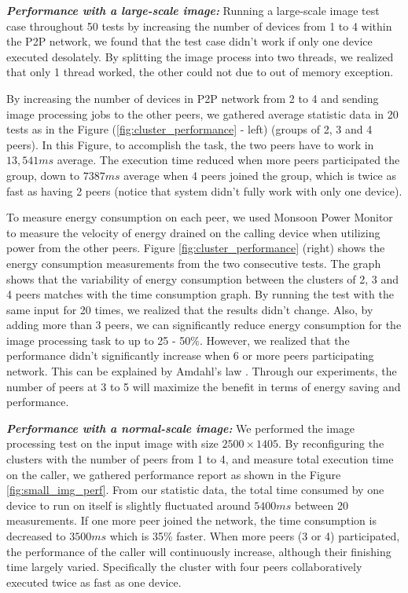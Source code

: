 \documentclass{sig-alternate}
\begin{document}
\textbf{\emph{Performance with a large-scale image:}}
Running a large-scale image test case throughout 50 tests by increasing the number of devices from 1 to 4 within the P2P network, we found that the test case didn't work if only one device executed desolately. By splitting the image process into two threads, we realized that only 1 thread worked, the other could not due to out of memory exception. 

By increasing the number of devices in P2P network from 2 to 4 and sending image processing jobs to the other peers, we gathered average statistic data in 20 tests as in the Figure (\ref{fig:cluster_performance} - left) (groups of 2, 3 and 4 peers). In this Figure, to accomplish the task, the two peers have to work in $13,541ms$ average. The execution time reduced when more peers participated the group, down to $7387ms$ average when 4 peers joined the group, which is twice as fast as having 2 peers (notice that system didn't fully work with only one device).

To measure energy consumption on each peer, we used Monsoon Power Monitor \cite{moosoon} to measure the velocity of energy drained on the calling device when utilizing power from the other peers. Figure \ref{fig:cluster_performance} (right) shows the energy consumption measurements from the two consecutive tests. The graph shows that the variability of energy consumption between the clusters of 2, 3 and 4 peers matches with the time consumption graph. By running the test with the same input for 20 times, we realized that the results didn't change. Also, by adding more than 3 peers, we can significantly reduce energy consumption for the image processing task to up to 25 - 50\%. However, we realized that the performance didn't significantly increase when 6 or more peers participating network. This can be explained by Amdahl's law \cite{amdahl}. Through our experiments, the number of peers at 3 to 5 will maximize the benefit in terms of energy saving and performance.

\textbf{\emph{Performance with a normal-scale image:}}
We performed the image processing test on the input image with size $2500 \times 1405$. By reconfiguring the clusters with the number of peers from 1 to 4, and measure total execution time on the caller, we gathered performance report as shown in the Figure \ref{fig:small_img_perf}. From our statistic data, the total time consumed by one device to run on itself is slightly fluctuated around $5400ms$ between 20 measurements. If one more peer joined the network, the time consumption is decreased to $3500ms$ which is 35\% faster. When more peers (3 or 4) participated, the performance of the caller will continuously increase, although their finishing time largely varied. Specifically the cluster with four peers collaboratively executed twice as fast as one device.
\end{document}
